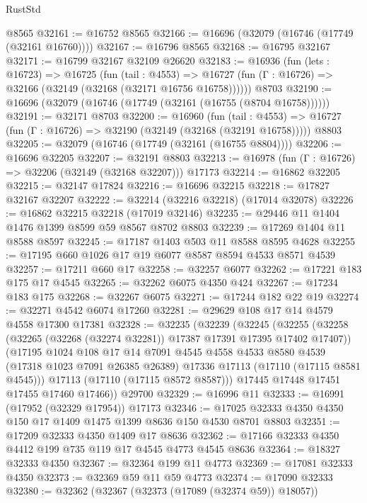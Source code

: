 \begin{lexlean}{RustStd}
\begin{coremodule}
    @8565
@32161 := @16752 @8565
@32166 := @16696 (@32079 (@16746 (@17749 (@32161 @16760))))
@32167 := @16796 @8565
@32168 := @16795 @32167
@32171 := @16799 @32167 @32109 @26620
@32183 := @16936
    (fun (lets : @16723) =>
    @16725
      (fun (tail : @4553) =>
      @16727 (fun (Γ : @16726) => @32166 (@32149 (@32168 (@32171 @16756 @16758))))))
    @8703
@32190 := @16696 (@32079 (@16746 (@17749 (@32161 (@16755 (@8704 @16758))))))
@32191 := @32171 @8703
@32200 := @16960
    (fun (tail : @4553) => @16727 (fun (Γ : @16726) => @32190 (@32149 (@32168 (@32191 @16758)))))
    @8803
@32205 := @32079 (@16746 (@17749 (@32161 (@16755 @8804))))
@32206 := @16696 @32205
@32207 := @32191 @8803
@32213 := @16978 (fun (Γ : @16726) => @32206 (@32149 (@32168 @32207))) @17173
@32214 := @16862 @32205
@32215 := @32147 @17824
@32216 := @16696 @32215
@32218 := @17827 @32167 @32207
@32222 := @32214 (@32216 @32218) (@17014 @32078)
@32226 := @16862 @32215 @32218 (@17019 @32146)
@32235 := @29446 @11 @1404 @1476 @1399 @8599 @59 @8567 @8702 @8803
@32239 := @17269 @1404 @11 @8588 @8597
@32245 := @17187 @1403 @503 @11 @8588 @8595 @4628
@32255 := @17195 @660 @1026 @17 @19 @6077 @8587 @8594 @4533 @8571 @4539
@32257 := @17211 @660 @17
@32258 := @32257 @6077
@32262 := @17221 @183 @175 @17 @4545
@32265 := @32262 @6075 @4350 @424
@32267 := @17234 @183 @175
@32268 := @32267 @6075
@32271 := @17244 @182 @22 @19
@32274 := @32271 @4542 @6074 @17260
@32281 := @29629 @108 @17 @14 @4579 @4558 @17300 @17381
@32328 := @32235
    (@32239
      (@32245
        (@32255
          (@32258 (@32265 (@32268 (@32274 @32281)) @17387 @17391 @17395 @17402 @17407))
          (@17195
            @1024
            @108
            @17
            @14
            @7091
            @4545
            @4558
            @4533
            @8580
            @4539
            (@17318 @1023 @7091 @26385 @26389)
            @17336
            @17113
            (@17110 (@17115 @8581 @4545)))
          @17113
          (@17110 (@17115 @8572 @8587)))
        @17445
        @17448
        @17451
        @17455
        @17460
        @17466))
    @29700
@32329 := @16996 @11
@32333 := @16991 (@17952 (@32329 @17954)) @17173
@32346 := @17025 @32333 @4350 @4350 @150 @17 @1409 @1475 @1399 @8636 @150 @4530 @8701 @8803
@32351 := @17209 @32333 @4350 @1409 @17 @8636
@32362 := @17166 @32333 @4350 @4412 @199 @735 @119 @17 @4545 @4773 @4545 @8636
@32364 := @18327 @32333 @4350
@32367 := @32364 @199 @11 @4773
@32369 := @17081 @32333 @4350
@32373 := @32369 @59 @11 @59 @4773
@32374 := @17090 @32333
@32380 := @32362 (@32367 (@32373 (@17089 (@32374 @59)) @18057))

\end{coremodule}
\end{lexlean}

